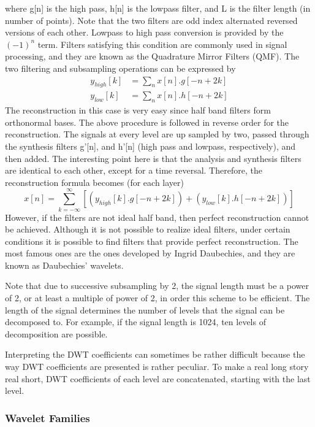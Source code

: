 \documentclass[12pt, a4paper, twoside]{report}
\begin{document}
where g[n] is the high pass, h[n] is the lowpass filter, and L is the filter length (in number of points). Note that the two filters are odd index alternated reversed versions of each other. Lowpass to high pass conversion is provided by the $(-1)^n$ term. Filters satisfying this condition are commonly used in signal processing, and they are known as the Quadrature Mirror Filters (QMF). The two filtering and subsampling operations can be expressed by
\begin{align}
y_{high}[k] &= \sum_{n} x[n].g[-n+2k] \\ 
y_{low}[k] &= \sum_{n} x[n].h[-n+2k]
\end{align}
The reconstruction in this case is very easy since half band filters form orthonormal bases. The above procedure is followed in reverse order for the reconstruction. The signals at every level are up sampled by two, passed through the synthesis filters g’[n], and h’[n] (high pass and lowpass, respectively), and then added. The interesting point here is that the analysis and synthesis filters are identical to each other, except for a time reversal. Therefore, the reconstruction formula becomes (for each layer)
\begin{equation}
x[n] = \sum_{k=-\infty}^{\infty} \left [ \left ( y_{high}[k].g[-n+2k] \right ) + \left ( y_{low}[k].h[-n+2k] \right ) \right ]
\end{equation}
However, if the filters are not ideal half band, then perfect reconstruction cannot be achieved. Although it is not possible to realize ideal filters, under certain conditions it is possible to find filters that provide perfect reconstruction. The most famous ones are the ones developed by Ingrid Daubechies, and they are known as Daubechies’ wavelets.
\par
Note that due to successive subsampling by 2, the signal length must be a power of 2, or at least a multiple of power of 2, in order this scheme to be efficient. The length of the signal determines the number of levels that the signal can be decomposed to. For example, if the signal length is 1024, ten levels of decomposition are possible.
\par 
Interpreting the DWT coefficients can sometimes be rather difficult because the way DWT coefficients are presented is rather peculiar. To make a real long story real short, DWT coefficients of each level are concatenated, starting with the last level.

\subsubsection{Wavelet Families}
\end{document}

